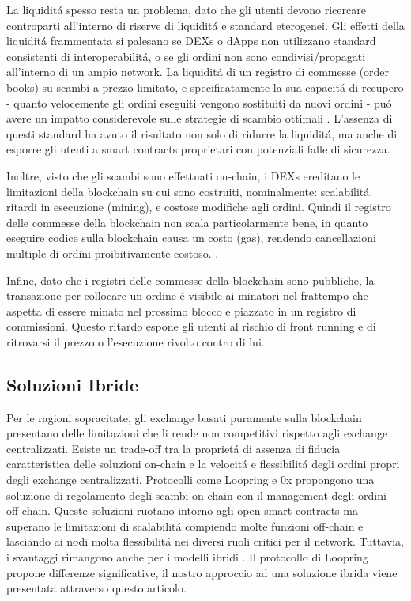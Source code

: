 \documentclass[UTF8,nofonts]{article}
\begin{document}
\begin{multicols}{2}
La liquidit\'a spesso resta un problema, dato che gli utenti devono ricercare controparti all'interno di riserve di liquidit\'a e standard eterogenei. Gli effetti della liquidit\'a frammentata si palesano se DEXs o dApps non utilizzano standard consistenti di interoperabilit\'a, o se gli ordini non sono condivisi/propagati all'interno di un ampio network. La liquidit\'a di un registro di commesse (order books) su scambi a prezzo limitato, e specificatamente la sua capacit\'a di  recupero - quanto velocemente gli ordini eseguiti vengono sostituiti da nuovi ordini - pu\'o avere un impatto considerevole sulle strategie di scambio ottimali \cite{limitorderliquidity}. L'assenza di questi standard ha avuto il risultato non solo di ridurre la liquidit\'a, ma anche di esporre gli utenti a smart contracts proprietari con potenziali falle di sicurezza.

Inoltre, visto che gli scambi sono effettuati on-chain, i DEXs ereditano le limitazioni della blockchain su cui sono costruiti, nominalmente: scalabilit\'a, ritardi in esecuzione (mining), e costose modifiche agli ordini. Quindi il registro delle commesse della blockchain non scala particolarmente bene, in quanto eseguire codice sulla blockchain causa un costo (gas), rendendo cancellazioni multiple di ordini proibitivamente costoso. .

Infine, dato che i registri delle commesse della blockchain sono pubbliche, la transazione per collocare un ordine \'e visibile ai minatori nel frattempo che aspetta di essere minato nel prossimo blocco e piazzato in un registro di commissioni. Questo ritardo espone gli utenti al rischio di front running e di ritrovarsi il prezzo o l'esecuzione rivolto contro di lui.

\subsection{Soluzioni Ibride}
Per le ragioni sopracitate, gli exchange basati puramente sulla blockchain presentano delle limitazioni che li rende non competitivi rispetto agli exchange centralizzati.  Esiste un trade-off tra la propriet\'a di assenza di fiducia caratteristica delle soluzioni on-chain  e la velocit\'a e flessibilit\'a degli ordini propri degli exchange centralizzati. Protocolli come Loopring e 0x  \cite{warren20170x} propongono una soluzione di regolamento degli scambi  on-chain con il management degli ordini off-chain. Queste soluzioni ruotano intorno agli open smart contracts ma superano le limitazioni di scalabilit\'a compiendo molte funzioni off-chain e lasciando ai nodi molta flessibilit\'a nei diversi ruoli critici per il network. Tuttavia, i svantaggi rimangono anche per i modelli ibridi \cite{costofdecent}. Il protocollo di Loopring propone differenze significative, il nostro approccio ad una soluzione ibrida viene presentata attraverso questo articolo.




\end{multicols}
\end{document}
